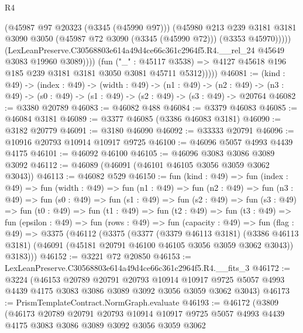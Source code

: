 \begin{lexlean}{R4}
\begin{coremodule}
                        (@45987 @97 @20323 (@3345 (@45990 @97)))
                        (@45980
                          @213
                          @239
                          @3181
                          @3181
                          @3090
                          @3050
                          (@45987 @72 @3090 (@3345 (@45990 @72)))
                          (@3353 @45970)))))
                  (LexLeanPreserve.C30568803e614a49d4ce66c361c2964f5.R4.__rel_24
                    @45649
                    @3083
                    @19960
                    @3089))))
            (fun ("_" : @45117 @3538) =>
            @4127 @45618 @196 @185 @239 @3181 @3181 @3050 @3081 @45711 @5312)))))
@46081 := (kind : @49) ->
  (index : @49) ->
  (width : @49) ->
  (n1 : @49) ->
  (n2 : @49) -> (n3 : @49) -> (s0 : @49) -> (s1 : @49) -> (s2 : @49) -> (s3 : @49) -> @20764
@46082 := @3380 @20789
@46083 := @46082 @488
@46084 := @3379 @46083
@46085 := @46084 @3181
@46089 := @3377 @46085 (@3386 @46083 @3181)
@46090 := @3182 @20779
@46091 := @3180 @46090
@46092 := @33333 @20791
@46096 := @10916 @20793 @10914 @10917 @9725
@46100 := @46096 @5057 @4993 @4439 @4175
@46101 := @46092 @46100
@46105 := @46096 @3083 @3086 @3089 @3092
@46112 := @46089 (@46091 (@46101 @46105 @3056 @3059 @3062 @3043))
@46113 := @46082 @529
@46150 := fun (kind : @49) =>
  fun (index : @49) =>
  fun (width : @49) =>
  fun (n1 : @49) =>
  fun (n2 : @49) =>
  fun (n3 : @49) =>
  fun (s0 : @49) =>
  fun (s1 : @49) =>
  fun (s2 : @49) =>
  fun (s3 : @49) =>
  fun (t0 : @49) =>
  fun (t1 : @49) =>
  fun (t2 : @49) =>
  fun (t3 : @49) =>
  fun (epsilon : @49) =>
  fun (rows : @49) =>
  fun (capacity : @49) =>
  fun (flag : @49) =>
  @3375
    (@46112
      (@3375
        (@3377
          (@3379 @46113 @3181)
          (@3386 @46113 @3181)
          (@46091 (@45181 @20791 @46100 @46105 @3056 @3059 @3062 @3043))
          @3183)))
@46152 := @3221 @72 @20850
@46153 := LexLeanPreserve.C30568803e614a49d4ce66c361c2964f5.R4.__fits_3
@46172 := @3224
    (@46153
      @20789
      @20791
      @20793
      @10914
      @10917
      @9725
      @5057
      @4993
      @4439
      @4175
      @3083
      @3086
      @3089
      @3092
      @3056
      @3059
      @3062
      @3043)
@46173 := PrismTemplateContract.NormGraph.evaluate
@46193 := @46172
    (@3809
      (@46173
        @20789
        @20791
        @20793
        @10914
        @10917
        @9725
        @5057
        @4993
        @4439
        @4175
        @3083
        @3086
        @3089
        @3092
        @3056
        @3059
        @3062

\end{coremodule}
\end{lexlean}
